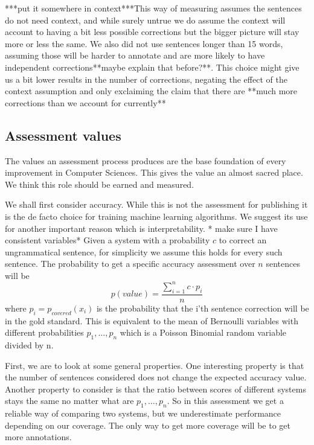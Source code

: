 \documentclass[english]{article}
\begin{document}
{*}{*}{*}put it somewhere in context{*}{*}{*}This way of measuring
assumes the sentences do not need context, and while surely untrue
we do assume the context will account to having a bit less possible
corrections but the bigger picture will stay more or less the same.
We also did not use sentences longer than 15 words, assuming those
will be harder to annotate and are more likely to have independent
corrections{*}{*}maybe explain that before?{*}{*}. This choice might
give us a bit lower results in the number of corrections, negating
the effect of the context assumption and only exclaiming the claim
that there are {*}{*}much more corrections than we account for currently{*}{*}

\subsection{Assessment values\label{sec:Assessment-values}}

The values an assessment process produces are the base foundation of
 every improvement in Computer Sciences. This gives the value an
  almost sacred place. We think this role should be earned and measured.
 
 We shall first consider accuracy. While this is not the assessment for publishing it is the de facto choice for training machine learning algorithms. We suggest its use for another important reason which is interpretability.
{*} make sure I have consistent variables{*}
Given a system with a probability $c$ to correct an ungrammatical sentence, for simplicity we assume this holds for every such sentence. The probability to get a specific accuracy assessment over $n$ sentences will be $$p\left(value\right)=\frac{\sum_{i=1}^{n}c\cdot p_i}{n} $$ 
where $p_i=p_{covered}\left(x_i\right) $ is the probability that the i'th sentence correction will be in the gold standard. This is equivalent to the mean of Bernoulli variables with different probabilities $p_1,\ldots,p_n$ which is a Poisson Binomial random variable divided by n. 

First, we are to look at some general properties.
 One interesting property is that the number of sentences considered does not change the expected accuracy value.
 Another property to consider is that the ratio between scores of different systems stays the same no matter what are $p_1,\ldots,p_n$. So in this assessment we get a reliable way of comparing two systems, but we underestimate performance depending on our coverage. The only way to get more coverage will be to get more annotations.
 
\end{document}
